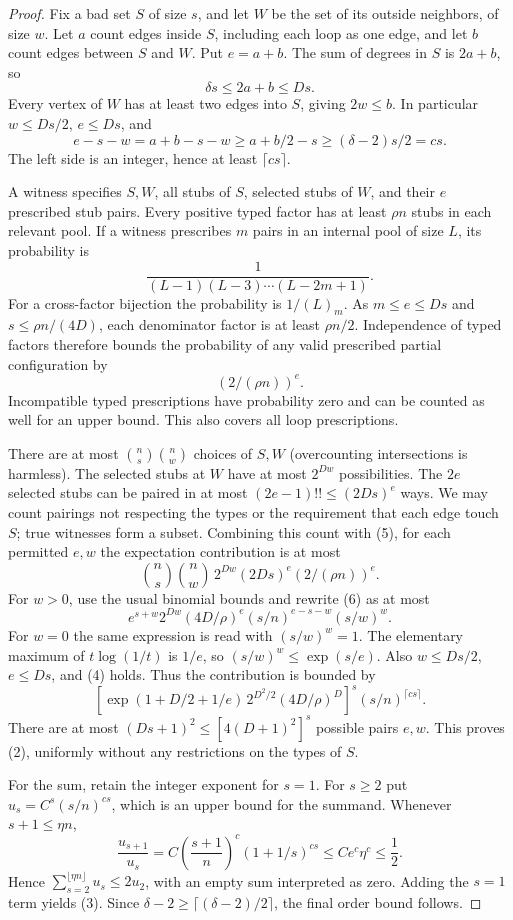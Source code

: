 \documentclass[11pt]{article}
\begin{document}
\begin{proof}
Fix a bad set $S$ of size $s$, and let $W$ be the set of its outside
neighbors, of size $w$. Let $a$ count edges inside $S$, including each
loop as one edge, and let $b$ count edges between $S$ and $W$. Put
$e=a+b$. The sum of degrees in $S$ is $2a+b$, so
\[
 \delta s\leq2a+b\leq Ds.
\]
Every vertex of $W$ has at least two edges into $S$, giving $2w\leq b$.
In particular $w\leq Ds/2$, $e\leq Ds$, and
\[
 e-s-w=a+b-s-w
 \geq a+b/2-s\geq(\delta-2)s/2=cs.
 \tag{4}
\]
The left side is an integer, hence at least $\lceil cs\rceil$.

A witness specifies $S,W$, all stubs of $S$, selected stubs of $W$, and
their $e$ prescribed stub pairs. Every positive typed factor has at least
$\rho n$ stubs in each relevant pool. If a witness prescribes $m$ pairs
in an internal pool of size $L$, its probability is
\[
 \frac1{(L-1)(L-3)\cdots(L-2m+1)}.
\]
For a cross-factor bijection the probability is $1/(L)_m$.
As $m\leq e\leq Ds$ and $s\leq\rho n/(4D)$, each denominator factor
is at least $\rho n/2$. Independence of typed factors therefore bounds
the probability of any valid prescribed partial configuration by
\[
 (2/(\rho n))^e.                                  \tag{5}
\]
Incompatible typed prescriptions have probability zero and can be counted
as well for an upper bound. This also covers all loop prescriptions.

There are at most $\binom ns\binom nw$ choices of $S,W$ (overcounting
intersections is harmless). The selected stubs at $W$ have at most
$2^{Dw}$ possibilities. The $2e$ selected stubs can be paired in at most
$(2e-1)!!\leq(2Ds)^e$ ways. We may count pairings not respecting the
types or the requirement that each edge touch $S$; true witnesses form a
subset. Combining this count with (5), for each permitted $e,w$ the
expectation contribution is at most
\[
 \binom ns\binom nw\,2^{Dw}(2Ds)^e(2/(\rho n))^e.
 \tag{6}
\]
For $w>0$, use the usual binomial bounds and rewrite (6) as at most
\[
 e^{s+w}2^{Dw}(4D/\rho)^e
 (s/n)^{e-s-w}(s/w)^w.
\]
For $w=0$ the same expression is read with $(s/w)^w=1$.
The elementary maximum of $t\log(1/t)$ is $1/e$, so
$(s/w)^w\leq\exp(s/e)$. Also $w\leq Ds/2$, $e\leq Ds$, and (4) holds.
Thus the contribution is bounded by
\[
 \left[\exp(1+D/2+1/e)\,2^{D^2/2}(4D/\rho)^D\right]^s
 (s/n)^{\lceil cs\rceil}.
\]
There are at most $(Ds+1)^2\leq[4(D+1)^2]^s$ possible pairs $e,w$.
This proves (2), uniformly without any restrictions on the types of $S$.

For the sum, retain the integer exponent for $s=1$. For $s\geq2$ put
$u_s=C^s(s/n)^{cs}$, which is an upper bound for the summand. Whenever
$s+1\leq\eta n$,
\[
 \frac{u_{s+1}}{u_s}
 =C\left(\frac{s+1}{n}\right)^c
      (1+1/s)^{cs}
 \leq Ce^c\eta^c\leq\frac12.
\]
Hence $\sum_{s=2}^{\lfloor\eta n\rfloor}u_s\leq2u_2$, with an empty
sum interpreted as zero. Adding the $s=1$ term yields (3). Since
$\delta-2\geq\lceil(\delta-2)/2\rceil$, the final order bound follows.
\end{proof}
\end{document}
